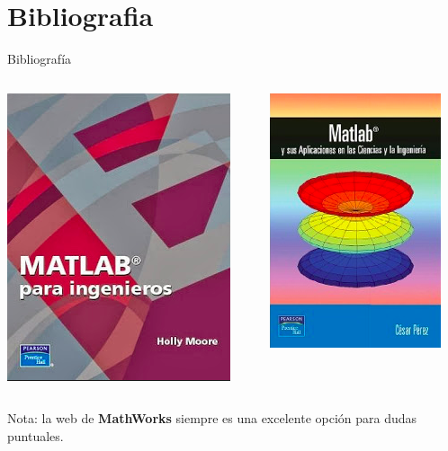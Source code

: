 \documentclass{bredelebeamer}
\begin{document}
\section{Bibliografia}

\begin{frame}{Bibliografía}
\begin{columns}
\begin{column}{0.5\textwidth}
\begin{center}
\includegraphics[scale=0.4]{images/biblio1.png}
\end{center}
\end{column}
\begin{column}{0.5\textwidth}
\begin{center}
\includegraphics[scale=0.5]{images/biblio2.png}
\end{center}
\end{column}
\end{columns}

Nota: la web de \textbf{MathWorks} siempre es una excelente opción para dudas puntuales.
\end{frame}
\end{document}
